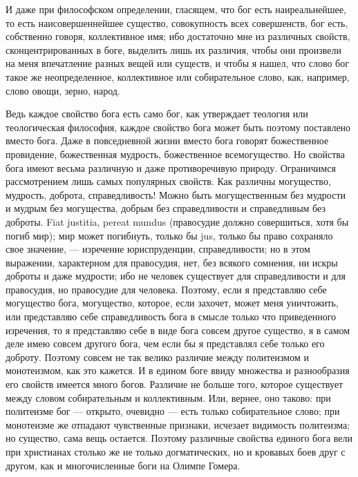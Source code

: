 \documentclass[12pt]{article}
\begin{document}
И даже при философском определении, гласящем, что бог есть наиреальнейшее, то есть наисовершеннейшее существо, совокупность всех совершенств, бог есть, собственно говоря, коллективное имя; ибо достаточно мне из различных свойств, сконцентрированных в боге, выделить лишь их различия, чтобы они произвели на меня впечатление разных вещей или существ, и чтобы я нашел, что слово бог такое же неопределенное, коллективное или собирательное слово, как, например, слово овощи, зерно, народ. 

Ведь каждое свойство бога есть само бог, как утверждает теология или теологическая философия, каждое свойство бога может быть поэтому поставлено вместо бога. Даже в повседневной жизни вместо бога говорят божественное провидение, божественная мудрость, божественное всемогущество. Но свойства бога имеют весьма различную и даже противоречивую природу. Ограничимся рассмотрением лишь самых популярных свойств. Как различны могущество, мудрость, доброта, справедливость! Можно быть могущественным без мудрости и мудрым без могущества, добрым без справедливости и справедливым без доброты. Fiat justitia, pereat mundus (правосудие должно совершиться, хотя бы погиб мир); мир может погибнуть, только бы jus, только бы право сохраняло свое значение, --- изречение юриспруденции, справедливости; но в этом выражении, характерном для правосудия, нет, без всякого сомнения, ни искры доброты и даже мудрости; ибо не человек существует для справедливости и для правосудия, но правосудие для человека. Поэтому, если я представляю себе могущество бога, могущество, которое, если захочет, может меня уничтожить, или представляю себе справедливость бога в смысле только что приведенного изречения, то я представляю себе в виде бога совсем другое существо, я в самом деле имею совсем другого бога, чем если бы я представлял себе только его доброту. Поэтому совсем не так велико различие между политеизмом и монотеизмом, как это кажется. И в едином боге ввиду множества и разнообразия его свойств имеется много богов. Различие не больше того, которое существует между словом собирательным и коллективным. Или, вернее, оно таково: при политеизме бог --- открыто, очевидно --- есть только собирательное слово; при монотеизме же отпадают чувственные признаки, исчезает видимость политеизма; но существо, сама вещь остается. Поэтому различные свойства единого бога вели при христианах столько же не только догматических, но и кровавых боев друг с другом, как и многочисленные боги на Олимпе Гомера. 
\end{document}
